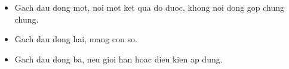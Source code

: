 \begin{itemize}
\item Gach dau dong mot, noi mot ket qua do duoc, khong noi dong gop chung chung.
\item Gach dau dong hai, mang con so.
\item Gach dau dong ba, neu gioi han hoac dieu kien ap dung.
\end{itemize}
